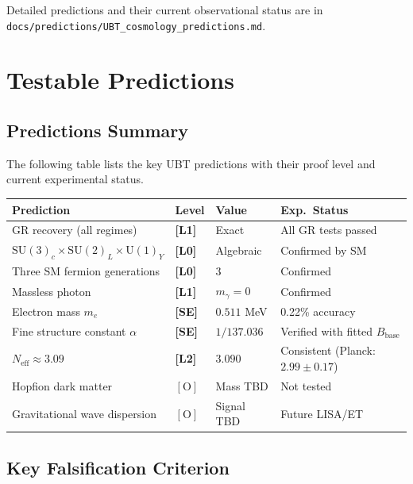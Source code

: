 \documentclass[12pt,a4paper]{article}
\newcommand{\Lzero}{\textbf{[L0]}}
\newcommand{\Lone}{\textbf{[L1]}}
\newcommand{\Ltwo}{\textbf{[L2]}}
\newcommand{\SE}{\textbf{[SE]}}
\begin{document}
Detailed predictions and their current observational status are in
\texttt{docs/predictions/UBT\_cosmology\_predictions.md}.

\section{Testable Predictions}
\label{sec:predictions}

\subsection{Predictions Summary}

The following table lists the key UBT predictions with their proof level
and current experimental status.

\begin{center}
\begin{tabular}{p{5cm}llp{3.5cm}}
\toprule
\textbf{Prediction} & \textbf{Level} & \textbf{Value} & \textbf{Exp.\ Status} \\
\midrule
GR recovery (all regimes) & \Lone & Exact & All GR tests passed \\
$\mathrm{SU}(3)_c\times\mathrm{SU}(2)_L\times\mathrm{U}(1)_Y$ & \Lzero & Algebraic & Confirmed by SM \\
Three SM fermion generations & \Lzero & 3 & Confirmed \\
Massless photon & \Lone & $m_\gamma = 0$ & Confirmed \\
Electron mass $m_e$ & \SE & $0.511$ MeV & 0.22\% accuracy \\
Fine structure constant $\alpha$ & \SE & $1/137.036$ & Verified with fitted $B_\text{base}$ \\
$N_\text{eff} \approx 3.09$ & \Ltwo & $3.090$ & Consistent (Planck: $2.99\pm0.17$) \\
Hopfion dark matter & $[\mathrm{O}]$ & Mass TBD & Not tested \\
Gravitational wave dispersion & $[\mathrm{O}]$ & Signal TBD & Future LISA/ET \\
\bottomrule
\end{tabular}
\end{center}

\subsection{Key Falsification Criterion}
\end{document}
